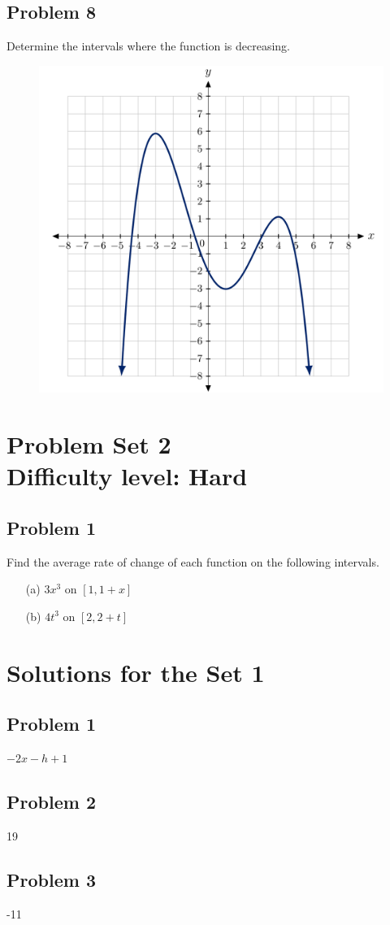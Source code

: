 \documentclass[12pt]{article}
\begin{document}
\newpage
\subsection*{Problem 8}
Determine the intervals where the function is decreasing.
\begin{figure}[!ht]
    \centering
    \includegraphics[width=0.5\linewidth]{6.png}
\end{figure}

\section*{Problem Set 2\\Difficulty level: Hard}
\subsection*{Problem 1}
Find the average rate of change of each function on the following intervals.

    \begin{enumerate}
        \item[(a)] \(3x^3\) on \([1,1+x]\)
        \item[(b)] \(4t^3\) on \([2,2+t]\)
        
    \end{enumerate}

\section*{Solutions for the Set 1}
\subsection*{Problem 1}
\(-2x-h+1\)
\subsection*{Problem 2}
19
\subsection*{Problem 3}
-11
\end{document}
